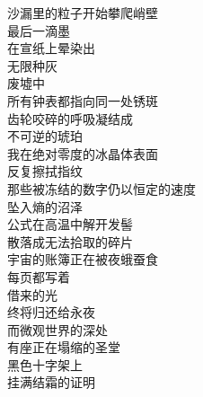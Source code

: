 \documentclass{ctexart}
\begin{document}
\pagestyle{plain}
\setcounter{footnote}{0}
\begin{center}
\end{center}\vspace{15pt}
\begin{center}
    沙漏里的粒子开始攀爬峭壁\\
    最后一滴墨\\
    在宣纸上晕染出\\
    无限种灰\\
    废墟中\\
    所有钟表都指向同一处锈斑\\
    齿轮咬碎的呼吸凝结成\\
    不可逆的琥珀\\
    我在绝对零度的冰晶体表面\\
    反复擦拭指纹\\
    那些被冻结的数字仍以恒定的速度\\
    坠入熵的沼泽\\
    公式在高温中解开发髻\\
    散落成无法拾取的碎片\\
    宇宙的账簿正在被夜蛾蚕食\\
    每页都写着\\
    借来的光\\
    终将归还给永夜\\
    而微观世界的深处\\
    有座正在塌缩的圣堂\\
    黑色十字架上\\
    挂满结霜的证明
\end{center}
\newpage
\newpage
\newpage
\newpage
\newpage
\newpage
\end{document}
